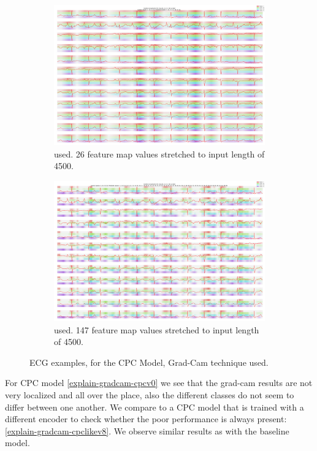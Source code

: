 \begin{figure}
	\begin{subfigure}[t]{1\textwidth}\centering
		\includegraphics[width=\linewidth]{"bilder/HR07448-class:[4, 16, 33, 41]-gradient-camcpc0.png"}
		\caption{ used. 26 feature map values stretched to input length of 4500.}
		\label{explain-gradcam-cpcv0}
		\centering
	\end{subfigure}
	\begin{subfigure}[t]{1\textwidth}\centering
		\includegraphics[width=\linewidth]{"bilder/HR07448-class:[4, 16, 33, 41]-gradient-camcpc8.png"}
		\caption{ used. 147 feature map values stretched to input length of 4500.}
		\label{explain-gradcam-cpclikev8}
		\centering
	\end{subfigure}	
	\caption{ECG examples, for the CPC Model, Grad-Cam technique used.}
\end{figure}
For CPC model \autoref{explain-gradcam-cpcv0} we see that the grad-cam results are not very localized and all over the place, also the different classes do not seem to differ between one another. We compare to a CPC model that is trained with a different encoder to check whether the poor performance is always present: \autoref{explain-gradcam-cpclikev8}. We observe similar results as with the baseline model.

